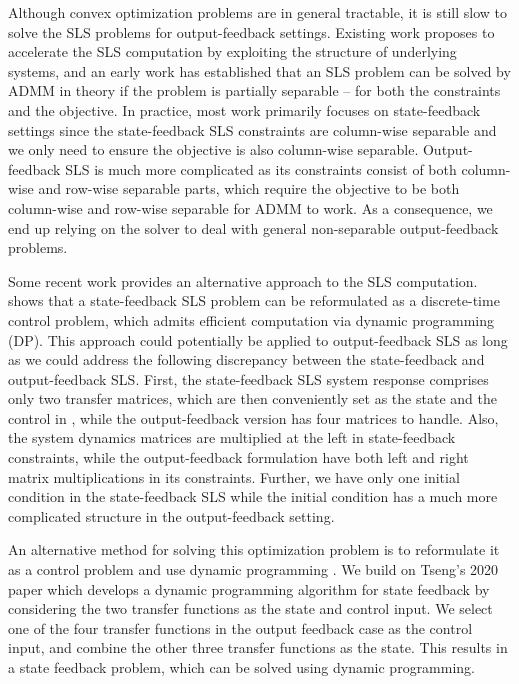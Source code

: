 Although convex optimization problems are in general tractable, it is still slow to solve the SLS problems for output-feedback settings.
Existing work proposes to accelerate the SLS computation by exploiting the structure of underlying systems, and an early work \cite{wang2018separable} has established that an SLS problem can be solved by ADMM in theory if the problem is partially separable -- for both the constraints and the objective. In practice, most work primarily focuses on state-feedback settings \cite{anderson2017structured,matni2017scalable,amo-alonso2020distributed,amo-alonsosubeffective} since the state-feedback SLS constraints are column-wise separable and we only need to ensure the objective is also column-wise separable. Output-feedback SLS is much more complicated as its constraints consist of both column-wise and row-wise separable parts, which require the objective to be both column-wise and row-wise separable for ADMM to work. As a consequence, we end up relying on the solver to deal with general non-separable output-feedback problems.

Some recent work provides an alternative approach to the SLS computation. \cite{tseng2020system} shows that a state-feedback SLS problem can be reformulated as a discrete-time control problem, which admits efficient computation via dynamic programming (DP). This approach could potentially be applied to output-feedback SLS as long as we could address the following discrepancy between the state-feedback and output-feedback SLS. First, the state-feedback SLS system response comprises only two transfer matrices, which are then conveniently set as the state and the control in \cite{tseng2020system}, while the output-feedback version has four matrices to handle. Also, the system dynamics matrices are multiplied at the left in state-feedback constraints, while the output-feedback formulation have both left and right matrix multiplications in its constraints. Further, we have only one initial condition in the state-feedback SLS while the initial condition has a much more complicated structure in the output-feedback setting. 

\iffalse
An alternative method for solving this optimization problem is to reformulate it as a control problem and use dynamic programming \cite{bertsekas2005dynamic1}.
We build on Tseng's 2020 \cite{tseng2020system} paper which develops a dynamic programming algorithm for state feedback by 
considering the two transfer functions as the state and control input. We select one of the four transfer
functions in the output feedback case as the control input, and combine the other three transfer functions
as the state. This results in a state feedback problem, which can be solved using dynamic programming. 


